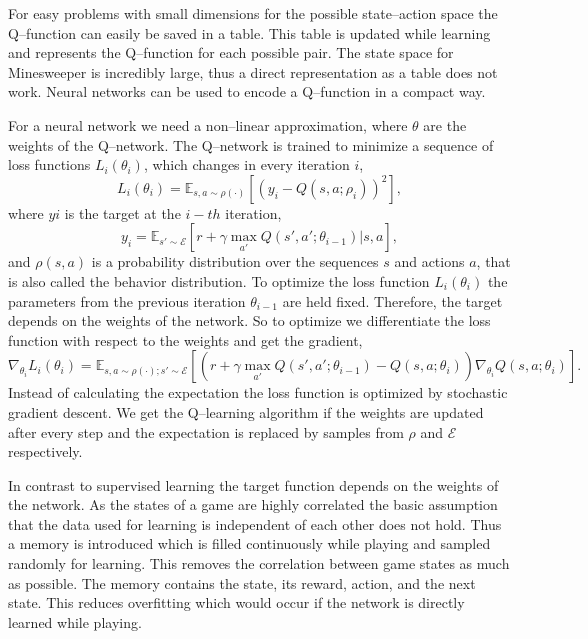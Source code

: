 For easy problems with small dimensions for the possible state--action space the Q--function can easily be saved in a table.
This table is updated while learning and represents the Q--function for each possible pair.
The state space for Minesweeper is incredibly large, thus a direct representation as a table does not work.
Neural networks can be used to encode a Q--function in a compact way.

For a neural network we need a non--linear approximation, where $\theta$ are the weights of the Q--network.
The Q--network is trained to minimize a sequence of loss functions $L_i\left(\theta_i\right)$, which changes in every iteration $i$,
\begin{equation}
L_i\left(\theta_i\right)= \mathbb{E}_{s,a \sim \rho \left( \cdot \right)}\left[ \left( y_i - Q\left(s,a;\rho_i \right) \right)^2\right],
\end{equation}
where $yi$ is the target at the $i-th$ iteration,
\begin{equation}
y_i = \mathbb{E}_{s'\sim \mathcal{E}}\left[ r+ \gamma \max_{a'} Q\left( s',a'; \theta_{i-1}\right)| s,a\right],
\end{equation}
and $\rho\left(s,a\right)$ is a probability distribution over the sequences $s$ and actions $a$, that is also called the behavior distribution.
To optimize the loss function $L_i\left(\theta_i\right)$ the parameters from the previous iteration $\theta_{i-1}$ are held fixed. 
Therefore, the target depends on the weights of the network. 
So to optimize we differentiate the loss function with respect to the weights and get the gradient,
\begin{equation}
\nabla_{\theta_i} L_i\left(\theta_i\right)= \mathbb{E}_{s,a\sim\rho\left(\cdot\right);s'\sim \mathcal{E}} \left[ \left( r + \gamma \max_{a'}Q\left(s',a';\theta_{i-1}\right) -Q\left(s,a;\theta_i\right) \right)\nabla_{\theta_i}Q\left(s,a;\theta_i\right)\right].
\end{equation}
Instead of calculating the expectation the loss function is optimized by stochastic gradient descent.
We get the Q--learning algorithm if the weights are updated after every step and the expectation is replaced by samples from $\rho$ and $\mathcal{E}$ respectively.

In contrast to supervised learning the target function depends on the weights of the network.
As the states of a game are highly correlated the basic assumption that the data used for learning is independent of each other does not hold.
Thus a memory is introduced which is filled continuously while playing and sampled randomly for learning.
This removes the correlation between game states as much as possible.
The memory contains the state, its reward, action, and the next state.
This reduces overfitting which would occur if the network is directly learned while playing.

